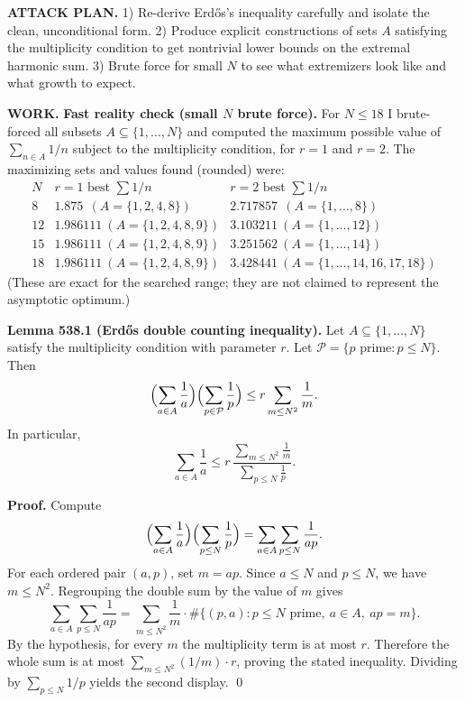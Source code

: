 \noindent\textbf{ATTACK PLAN.}
1) Re-derive Erd\H{o}s's inequality carefully and isolate the clean, unconditional form.
2) Produce explicit constructions of sets $A$ satisfying the multiplicity condition to get nontrivial lower bounds on the extremal harmonic sum.
3) Brute force for small $N$ to see what extremizers look like and what growth to expect.

\noindent\textbf{WORK.}
\textbf{Fast reality check (small $N$ brute force).}
For $N\le 18$ I brute-forced all subsets $A\subseteq\{1,\dots,N\}$ and computed the maximum possible value of $\sum_{n\in A}1/n$ subject to the multiplicity condition, for $r=1$ and $r=2$.
The maximizing sets and values found (rounded) were:
\[
\begin{array}{c|l|l}
N & r=1\text{ best }\sum 1/n & r=2\text{ best }\sum 1/n\\\hline
8 & 1.875\ \ (A=\{1,2,4,8\}) & 2.717857\ \ (A=\{1,\dots,8\})\\
12 & 1.986111\ (A=\{1,2,4,8,9\}) & 3.103211\ (A=\{1,\dots,12\})\\
15 & 1.986111\ (A=\{1,2,4,8,9\}) & 3.251562\ (A=\{1,\dots,14\})\\
18 & 1.986111\ (A=\{1,2,4,8,9\}) & 3.428441\ (A=\{1,\dots,14,16,17,18\})
\end{array}
\]
(These are exact for the searched range; they are not claimed to represent the asymptotic optimum.)

\medskip
\textbf{Lemma 538.1 (Erd\H{o}s double counting inequality).}
Let $A\subseteq\{1,\dots,N\}$ satisfy the multiplicity condition with parameter $r$.
Let $\mathcal P=\{p\text{ prime}: p\le N\}$.
Then
\[
\Bigl(\sum_{a\in A}\frac{1}{a}\Bigr)\Bigl(\sum_{p\in\mathcal P}\frac{1}{p}\Bigr)
\le r\sum_{m\le N^2}\frac{1}{m}.
\]
In particular,
\[
\sum_{a\in A}\frac{1}{a}\le r\,\frac{\sum_{m\le N^2}\frac{1}{m}}{\sum_{p\le N}\frac{1}{p}}.
\]

\textbf{Proof.}
Compute
\[
\Bigl(\sum_{a\in A}\frac{1}{a}\Bigr)\Bigl(\sum_{p\le N}\frac{1}{p}\Bigr)
=\sum_{a\in A}\sum_{p\le N}\frac{1}{ap}.
\]
For each ordered pair $(a,p)$, set $m=ap$. Since $a\le N$ and $p\le N$, we have $m\le N^2$.
Regrouping the double sum by the value of $m$ gives
\[
\sum_{a\in A}\sum_{p\le N}\frac{1}{ap}
=\sum_{m\le N^2}\frac{1}{m}\cdot \#\{(p,a): p\le N\text{ prime},\ a\in A,\ ap=m\}.
\]
By the hypothesis, for every $m$ the multiplicity term is at most $r$.
Therefore the whole sum is at most
\(\sum_{m\le N^2} (1/m)\cdot r\), proving the stated inequality.
Dividing by $\sum_{p\le N}1/p$ yields the second display. \qed

